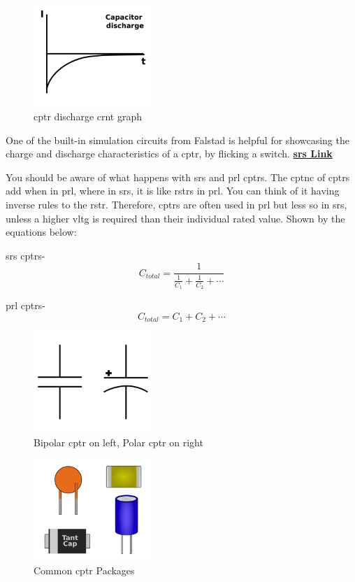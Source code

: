 \documentclass[a4paper,11pt]{report}
\let\oldhref\href %
\renewcommand{\href}[2]{\oldhref{#1}{\bf\gls{srs} #2}}
\begin{document}
\begin{figure}[H]
\centering
\includegraphics[width=0.4\textwidth]{capacitordischargecurrent}
\caption{\gls{cptr} discharge \gls{crnt} graph}
\end{figure}

One of the built-in simulation circuits from Falstad is helpful for showcasing the charge and discharge characteristics of a \gls{cptr}, by flicking a switch. \href{https://tinyurl.com/2erbz4jy}{Link}

You should be aware of what happens with \gls{srs} and \gls{prl} \gls{cptr}s. The \gls{cptnc} of \gls{cptr}s add when in \gls{prl}, where in \gls{srs}, it is like \gls{rstr}s in \gls{prl}. You can think of it having inverse rules to the \gls{rstr}. Therefore, \gls{cptr}s are often used in \gls{prl} but less so in \gls{srs}, unless a higher \gls{vltg} is required than their individual rated value. Shown by the equations below:

\gls{srs} \gls{cptr}s- \[C_{total} = \frac{1}{\frac{1}{C_1}+\frac{1}{C_2}+\cdots}\]

\gls{prl} \gls{cptr}s- \[C_{total} = C_1+C_2+\cdots\]

\begin{figure}[H]
\centering
\includegraphics[width=0.4\textwidth]{capacitor1}
\caption{Bipolar \gls{cptr} on left, Polar \gls{cptr} on right}
\end{figure}

\begin{figure}[H]
\centering
\includegraphics[width=0.4\textwidth]{capacitorPackages}
\caption{Common \gls{cptr} Packages}
\end{figure}
\end{document}
